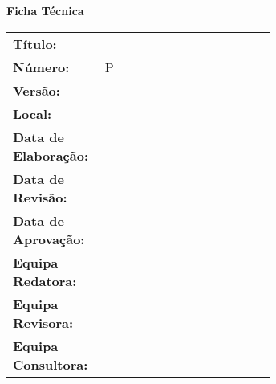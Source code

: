 %

\vfill
\begin{flushleft}
	\textbf{\textcolor{colorschema}{Ficha Técnica}} \\
	\vspace{12pt}
	
	{
		\renewcommand{\arraystretch}{1.4}
		\begin{tabular}{l!{\color{colorschema}\vrule width 0.5mm}p{0.65\linewidth}}
		    \textbf{Título:}             & \titulo\\
		    \textbf{Número:}             & P\numero\\
		    \textbf{Versão:}             & {\versao} \\
		    \textbf{Local:}              & \local \\
		    \textbf{Data de Elaboração:} & \dataElaboracao \\
		    \textbf{Data de Revisão:}    & \dataRevisao \\
		    \textbf{Data de Aprovação:}  & \dataAprovacao \\
		    \textbf{Equipa Redatora:}    & \equipaRedatora \\
		    \textbf{Equipa Revisora:}    & \equipaRevisora \\
		    \textbf{Equipa Consultora:}  & \equipaConsultora \\
		\end{tabular}
	}
\end{flushleft}